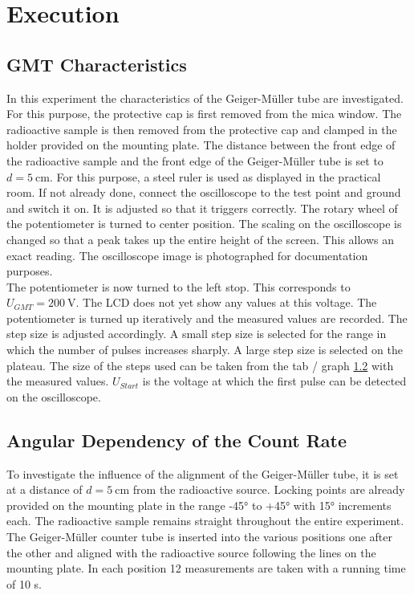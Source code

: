 \chapter{Execution}
\section{GMT Characteristics}
In this experiment the characteristics of the Geiger-Müller tube are investigated. For this purpose, the protective cap
is first removed from the mica window. The radioactive sample is then removed from the protective cap and clamped in the
holder provided on the mounting plate. The distance between the front edge of the radioactive sample and the front edge
of the Geiger-Müller tube is set to $d = 5\ \mathrm{cm}$. For this purpose, a steel ruler is used as displayed in the
practical room. If not already done, connect the oscilloscope to the test point and ground and switch it on. It is
adjusted so that it triggers correctly. The rotary wheel of the potentiometer is turned to center position. The scaling
on the oscilloscope is changed so that a peak takes up the entire height of the screen. This allows an exact reading.
The oscilloscope image is photographed for documentation purposes.\\
The potentiometer is now turned to the left stop. This corresponds to $U_{GMT} = 200\ \mathrm{V}$. The LCD does not yet
show any values at this voltage. The potentiometer is turned up iteratively and the measured values are recorded. The
step size is adjusted accordingly. A small step size is selected for the range in which the number of pulses increases
sharply. A large step size is selected on the plateau. The size of the steps used can be taken from the tab / graph \ref{}
with the measured values. $U_{Start}$ is the voltage at which the first pulse can be detected on the oscilloscope.
%
\section{Angular Dependency of the Count Rate}
To investigate the influence of the alignment of the Geiger-Müller tube, it is set at a distance of $d = 5\ \mathrm{cm}$
from the radioactive source. Locking points are already provided on the mounting plate in the range -45° to +45° with 15°
increments each. The radioactive sample remains straight throughout the entire experiment. The Geiger-Müller counter
tube is inserted into the various positions one after the other and aligned with the radioactive source following the
lines on the mounting plate. In each position 12 measurements are taken with a running time of 10 s. 
%
